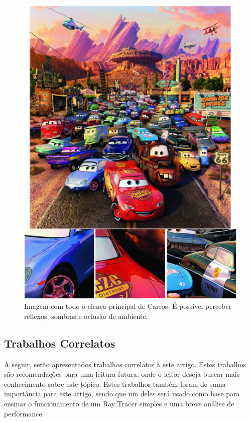\documentclass[journal]{IEEEtran}
\begin{document}
\begin{figure}[ht]
  \centering
  \includegraphics[width=\linewidth]{media/carros.png}
  \caption{Imagem com todo o elenco principal de Carros. É possível perceber reflexos, sombras e oclusão de ambiente. \cite{c9}}
  \label{img_carros}
\end{figure}

\subsection{Trabalhos Correlatos}
A seguir, serão apresentados trabalhos correlatos à este artigo. Estes trabalhos
são recomendações para uma leitura futura, onde o leitor deseja buscar mais
conhecimento sobre este tópico. Estes trabalhos também foram de suma importância
para este artigo, sendo que um deles será usado como base para ensinar o
funcionamento de um Ray Tracer simples e uma breve análise de performance.
\end{document}
